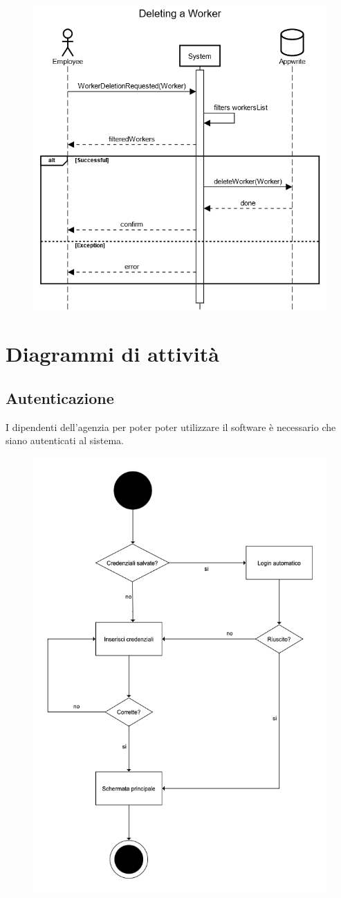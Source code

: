 \documentclass[a4paper, oneside, 12pt]{book}
\begin{document}
\begin{figure}[h!]
	\centering
	\includegraphics[width = 10 cm]{images/rimozione}
	\label{fig:Ricerca lavoratore}
\end{figure}

\newpage
\section{Diagrammi di attività}
\subsection{Autenticazione}
I dipendenti dell’agenzia per poter poter utilizzare il software è necessario che siano autenticati al sistema.

\begin{figure}[H]
	\centering
	\includegraphics[width = 10 cm]{images/logincredenziali.png}
	\label{fig:login credenziali}
\end{figure}
\end{document}
